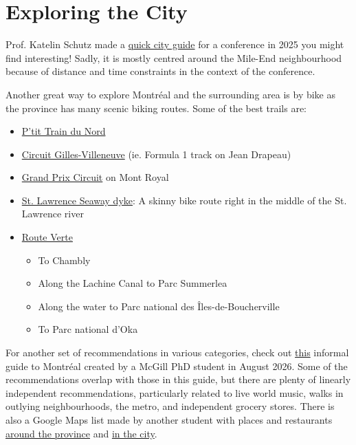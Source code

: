 \section{Exploring the City}\label{exploreMTL}
Prof. Katelin Schutz made a \href{https://indico.global/event/551/attachments/56549/116890/activities.pdf}{quick city guide} for a conference in 2025 you might find interesting! Sadly, it is mostly centred around the Mile-End neighbourhood because of distance and time constraints in the context of the conference.

Another great way to explore Montr\'eal and the surrounding area is by bike as the province has many scenic biking routes. Some of the best trails are: 
\begin{itemize}
    \item \href{https://en.ptittraindunord.com/}{P'tit Train du Nord}
    \item \href{https://www.parcjeandrapeau.com/en/circuit-gilles-villeneuve-multi-purpose-track-provelo-sports-training-montreal/}{Circuit Gilles-Villeneuve} (ie. Formula 1 track on Jean Drapeau)
    \item \href{https://gpcqm.ca/en/grand-prix-cycliste-montreal/}{Grand Prix Circuit} on Mont Royal
    \item \href{https://niche-canada.org/2014/02/12/a-river-runs-under-along-and-through-it-montreal-and-the-st-lawrence-seaway/}{St. Lawrence Seaway dyke}: A skinny bike route right in the middle of the St. Lawrence river
    \item \href{https://www.routeverte.com/carte-interactive/}{Route Verte}
        \begin{itemize}
            \item To Chambly
            \item Along the Lachine Canal to Parc Summerlea
            \item Along the water to Parc national des Îles-de-Boucherville
            \item To Parc national d'Oka
        \end{itemize}
\end{itemize}

For another set of recommendations in various categories, check out \href{https://sophiarubens.github.io/l-ile-infini/}{this} informal guide to Montr\'eal created by a McGill PhD student in August 2026. Some of the recommendations overlap with those in this guide, but there are plenty of linearly independent recommendations, particularly related to live world music, walks in outlying neighbourhoods, the metro, and independent grocery stores. There is also a Google Maps list made by another student with places and restaurants \href{https://maps.app.goo.gl/NpDyFci6MpNeW9ef7}{around the province} and \href{https://maps.app.goo.gl/VTJt8hk3R4DSWehXA}{in the city}.


